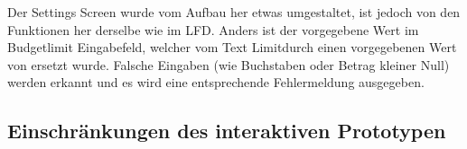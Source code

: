 \documentclass[a4paper,10pt]{article}
\begin{document}
Der Settings Screen wurde vom Aufbau her etwas umgestaltet, ist jedoch von den Funktionen her derselbe wie im LFD. Anders ist 
der vorgegebene Wert im Budgetlimit Eingabefeld, welcher vom Text \glqq
Limit\grqq\space durch einen vorgegebenen Wert von \grqq\space ersetzt
wurde. Falsche Eingaben (wie Buchstaben oder Betrag kleiner Null) werden erkannt und es wird eine entsprechende Fehlermeldung ausgegeben.


\clearpage
\subsection{Einschr\"ankungen des interaktiven Prototypen}

\end{document}
